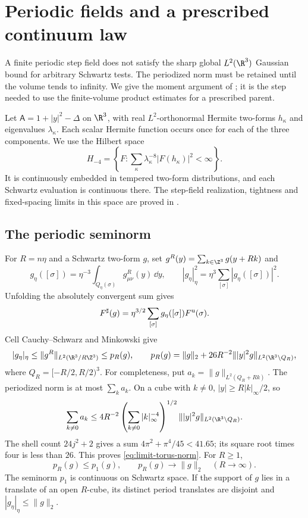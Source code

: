 \section{Periodic fields and a prescribed continuum law}
\label{sec:continuum-limits}

A finite periodic step field does not satisfy the sharp global
$L^2(\R^3)$ Gaussian bound for arbitrary Schwartz tests.
The periodized norm must be retained until the volume tends
to infinity. We give the moment argument of
\cite[\S6.1--6.2]{QED3Master}; it is the step needed to use the
finite-volume product estimates for a prescribed parent.

Let $\mathsf A=1+|y|^2-\Delta$ on $\R^3$, with real
$L^2$-orthonormal Hermite two-forms $h_\kappa$ and eigenvalues
$\lambda_\kappa$. Each scalar Hermite function occurs once
for each of the three components. We use the Hilbert space
\[
 H_{-4}=\left\{F:\sum_\kappa\lambda_\kappa^{-8}
                                  |F(h_\kappa)|^2<\infty\right\}.
\]
It is continuously embedded in tempered two-form distributions,
and each Schwartz evaluation is continuous there.
The step-field realization, tightness and fixed-spacing limits
in this space are proved in \cite{ContinuumExistence}.

\subsection{The periodic seminorm}

For $R=n\eta$ and a Schwartz two-form $g$, set
$g^R(y)=\sum_{k\in\Z^3}g(y+Rk)$ and
\[
 g_\eta([\sigma])=\eta^{-3}
                \int_{Q_\eta(\sigma)}g^R_{\mu\nu}(y)\,\dd y,
 \qquad |g_\eta|_\eta^2=\eta^3\sum_{[\sigma]}|g_\eta([\sigma])|^2.
\]
Unfolding the absolutely convergent sum gives
\begin{equation}\label{eq:limit-step-pairing}
 F^\sharp(g)=\eta^{3/2}\sum_{[\sigma]}
                         g_\eta([\sigma])F^{\rm u}(\sigma).
\end{equation}
Cell Cauchy--Schwarz and Minkowski give
\begin{equation}\label{eq:limit-torus-norm}
 |g_\eta|_\eta\le\|g^R\|_{L^2(\R^3/R\Z^3)}\le p_R(g),
 \qquad
 p_R(g)=\|g\|_2+
      26R^{-2}\||y|^2g\|_{L^2(\R^3\setminus Q_R)},
\end{equation}
where $Q_R=[-R/2,R/2)^3$.
For completeness, put $a_k=\|g\|_{L^2(Q_R+Rk)}$.
The periodized norm is at most $\sum_ka_k$. On a cube with
$k\ne0$, $|y|\ge R|k|_\infty/2$, so
\[
 \sum_{k\ne0}a_k
 \le4R^{-2}\left(\sum_{k\ne0}|k|_\infty^{-4}\right)^{1/2}
                 \||y|^2g\|_{L^2(\R^3\setminus Q_R)}.
\]
The shell count $24j^2+2$ gives a sum
$4\pi^2+\pi^4/45<41.65$; its square root times four is
less than $26$. This proves \eqref{eq:limit-torus-norm}.
For $R\ge1$,
\[
 p_R(g)\le p_1(g),\qquad p_R(g)\longrightarrow\|g\|_2
                      \quad(R\longrightarrow\infty).
\]
The seminorm $p_1$ is continuous on Schwartz space.
If the support of $g$ lies in a translate of an open
$R$-cube, its distinct period translates are disjoint and
$|g_\eta|_\eta\le\|g\|_2$.

